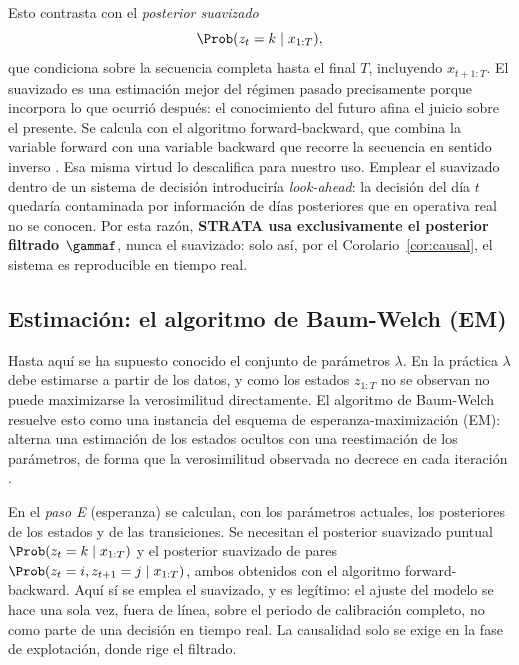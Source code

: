 Esto contrasta con el \emph{posterior suavizado}
\[
\Prob(z_t = k \mid x_{1:T}),
\]
que condiciona sobre la secuencia completa hasta el final $T$, incluyendo $x_{t+1:T}$. El suavizado es una estimación mejor del régimen pasado precisamente porque incorpora lo que ocurrió después: el conocimiento del futuro afina el juicio sobre el presente. Se calcula con el algoritmo forward-backward, que combina la variable forward con una variable backward que recorre la secuencia en sentido inverso \cite{baum1970, rabiner1989}. Esa misma virtud lo descalifica para nuestro uso. Emplear el suavizado dentro de un sistema de decisión introduciría \emph{look-ahead}: la decisión del día $t$ quedaría contaminada por información de días posteriores que en operativa real no se conocen. Por esta razón, \textbf{STRATA usa exclusivamente el posterior filtrado $\gammaf$}, nunca el suavizado: solo así, por el Corolario~\ref{cor:causal}, el sistema es reproducible en tiempo real.

\subsection{Estimación: el algoritmo de Baum-Welch (EM)}
\label{sec:hmm-em}

Hasta aquí se ha supuesto conocido el conjunto de parámetros $\lambda$. En la práctica $\lambda$ debe estimarse a partir de los datos, y como los estados $z_{1:T}$ no se observan no puede maximizarse la verosimilitud directamente. El algoritmo de Baum-Welch resuelve esto como una instancia del esquema de esperanza-maximización (EM): alterna una estimación de los estados ocultos con una reestimación de los parámetros, de forma que la verosimilitud observada no decrece en cada iteración \cite{baum1970, dempster1977}.

En el \emph{paso E} (esperanza) se calculan, con los parámetros actuales, los posteriores de los estados y de las transiciones. Se necesitan el posterior suavizado puntual $\Prob(z_t = k \mid x_{1:T})$ y el posterior suavizado de pares $\Prob(z_t = i, z_{t+1} = j \mid x_{1:T})$, ambos obtenidos con el algoritmo forward-backward. Aquí sí se emplea el suavizado, y es legítimo: el ajuste del modelo se hace una sola vez, fuera de línea, sobre el periodo de calibración completo, no como parte de una decisión en tiempo real. La causalidad solo se exige en la fase de explotación, donde rige el filtrado.

